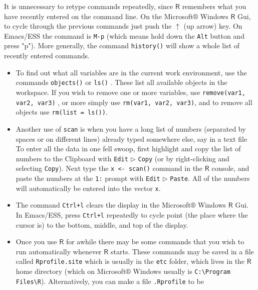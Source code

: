 It is unnecessary to retype commands repeatedly, since \(\mathsf{R}\)
remembers what you have recently entered on the command line. On the
Microsoft\(\circledR\) Windows \(\mathsf{R}\) Gui, to cycle through
the previous commands just push the \(\uparrow\) (up arrow) key. On
Emacs/ESS the command is \texttt{M-p} (which means hold down the \texttt{Alt} button
and press "p"). More generally, the command \texttt{history()}
 will show a whole list of recently
entered commands.
\begin{itemize}
\item To find out what all variables are in the current work environment,
use the commands \texttt{objects()}  or
\texttt{ls()} . These list all available objects in
the workspace. If you wish to remove one or more variables, use
\texttt{remove(var1, var2, var3)} , or more
simply use \texttt{rm(var1, var2, var3)}, and to remove all objects use
\texttt{rm(list = ls())}.
\item Another use of \texttt{scan} is when you have a long list of numbers
(separated by spaces or on different lines) already typed somewhere
else, say in a text file To enter all the data in one fell swoop,
first highlight and copy the list of numbers to the Clipboard with
\texttt{Edit} \(\triangleright\) \texttt{Copy} (or by right-clicking and selecting
\texttt{Copy}). Next type the \texttt{x <- scan()} command in the \(\mathsf{R}\)
console, and paste the numbers at the \texttt{1:} prompt with \texttt{Edit}
\(\triangleright\) \texttt{Paste}. All of the numbers will automatically be
entered into the vector \texttt{x}.
\item The command \texttt{Ctrl+l} clears the display in the
Microsoft\(\circledR\) Windows \(\mathsf{R}\) Gui. In Emacs/ESS,
press \texttt{Ctrl+l} repeatedly to cycle point (the place where the cursor
is) to the bottom, middle, and top of the display.
\item Once you use \(\mathsf{R}\) for awhile there may be some commands
that you wish to run automatically whenever \(\mathsf{R}\)
starts. These commands may be saved in a file called \texttt{Rprofile.site}
 which is
usually in the \texttt{etc} folder, which lives in the \(\mathsf{R}\) home
directory (which on Microsoft\(\circledR\) Windows usually is
\texttt{C:\textbackslash{}Program Files\textbackslash{}R}). Alternatively, you can make a file
\texttt{.Rprofile}  to be

\end{itemize}
